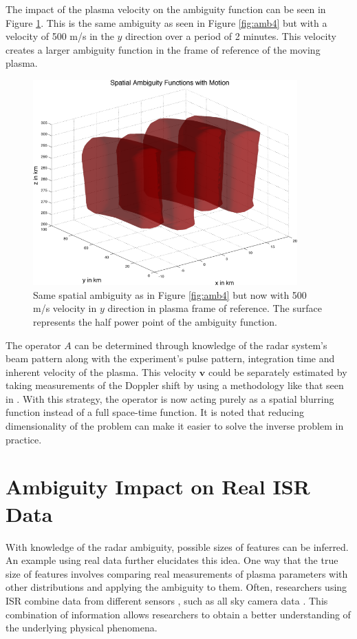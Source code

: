 \noindent The impact of the plasma velocity on the ambiguity function can be seen in Figure \ref{fig:ambtime}. This is the same ambiguity as seen in Figure \ref{fig:amb4} but with a velocity of 500 m/s in the $y$ direction over a period of 2 minutes. This velocity creates a larger ambiguity function in the frame of reference of the moving plasma.

\begin{figure}[!t]
	\centering
	\includegraphics[width=4in]{spaceambmoving}
	\caption{Same spatial ambiguity as in Figure \ref{fig:amb4} but now with 500 m/s velocity in $y$ direction in plasma frame of reference. The surface represents the half power point of the ambiguity function.}
	\label{fig:ambtime}
\end{figure}

The operator $A$ can be determined through knowledge of the radar system's beam pattern along with the experiment's pulse pattern, integration time and inherent velocity of the plasma. This velocity $\mathbf{v}$ could be separately estimated by taking measurements of the Doppler shift by using a methodology like that seen in \citet{butler:imagingfregiondrifts}. With this strategy, the operator is now acting purely as a spatial blurring function instead of a full space-time function. It is noted that reducing dimensionality of the problem can make it easier to solve the inverse problem in practice.

\section{Ambiguity Impact on Real ISR Data}

With knowledge of the radar ambiguity, possible sizes of features can be inferred. An example using real data further elucidates this idea. One way that the true size of features involves comparing real measurements of plasma parameters with other distributions and applying the ambiguity to them. Often, researchers using ISR combine data from different sensors \citep{Dahlgren:2012dq}, such as all sky camera data \citep{Shiokawa1999,GRL:GRL21871,Shiokawa2009}. This combination of information allows researchers to obtain a better understanding of the underlying physical phenomena.

